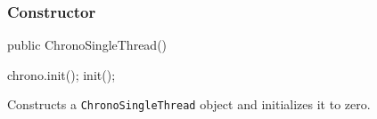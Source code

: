 \subsubsection*{Constructor}

\begin{code}

   public ChronoSingleThread()\begin{hide} {
      chrono.init();
      init();
   }\end{hide}
\end{code}
  \begin{tabb} Constructs a \texttt{ChronoSingleThread} object and
    initializes it to zero.
  \end{tabb}
\begin{code}
\begin{hide}
}\end{hide}
\end{code}
